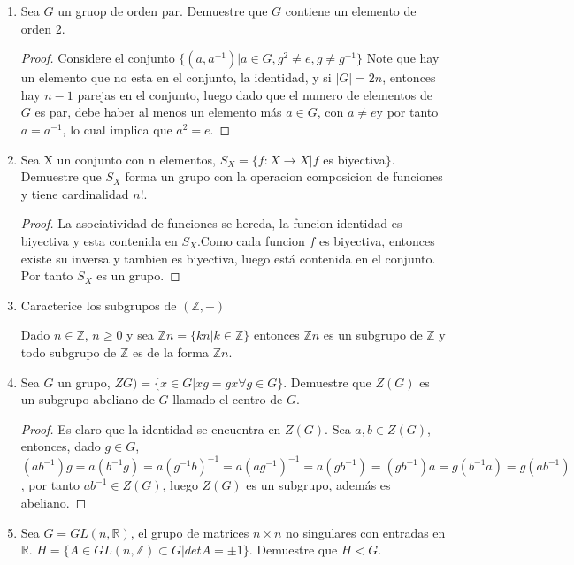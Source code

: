 \documentclass{article}
\theoremstyle{break}
\begin{document}
\begin{enumerate}
		\begin{proof}
			Sea $ A,B\in I(S)$ entonces, como $A(S)\subset S y A^{-1}(S)\subset S$ entonces $A^{-1}(S)\subset S$ y $(A^{-1})^{-1}(S)\subset SA^{-1}(S)\subset S$ implican que $A^{-1}\subset S$ Luego la composicion de funcioes tambien es ortogonal, por lo cual $B\circ A^{-1}(S) \subset B(S)\subset S$ y tambien para la imagen inversa, por lo tanto, $I(S)$ es un subgrupo.
		
		\end{proof}
		
		\item Sea $G$ un gruop de orden par. Demuestre que $G$ contiene un elemento de orden 2.
		
			\begin{proof}
				Considere el conjunto $\{(a,a^{-1})|a\in G, g^2\not=e, g\not=g^{-1}\}$ Note que hay un elemento que no esta en el conjunto, la identidad, y si $|G|=2n$, entonces hay $n-1$ parejas en el conjunto, luego dado que el numero de elementos de $G$ es par, debe haber al menos un elemento m\'as $a\in G$, con $a\not=e$y por tanto $a=a^{-1}$, lo cual implica que $a^2=e$.
				
			\end{proof}
			
		\item Sea X un conjunto con n elementos, $S_X=\{f:X\rightarrow X| f$ es biyectiva$\}$. Demuestre que $S_X$ forma un grupo con la operacion composicion de funciones y tiene cardinalidad $n!$. 
			\begin{proof}
				
				La asociatividad de funciones se hereda, la funcion identidad es biyectiva y esta contenida en $S_X$.Como cada funcion $f$ es biyectiva, entonces existe su inversa y tambien es biyectiva, luego est\'a contenida en el conjunto. Por tanto $S_X$ es un grupo.

			\end{proof}
		\item Caracterice los subgrupos de $(\mathbb{Z},+)$
		
			Dado $n\in\mathbb{Z}$, $n\geq 0$ y sea $\mathbb{Z}n=\{kn|k\in\mathbb{Z}\}$ entonces $\mathbb{Z}n$ es un subgrupo de $\mathbb{Z}$ y todo subgrupo de $\mathbb{Z}$ es de la forma $\mathbb{Z}n$.
			
			\item Sea $G$ un grupo, $ZG)=\{ x\in G|xg=gx  \forall g\in G\}$. Demuestre que $Z(G)$ es un subgrupo abeliano de $G$ llamado el centro de $G$.
			
			\begin{proof}
				Es claro que la identidad se encuentra en $Z(G)$. Sea $a,b\in Z(G)$, entonces, dado $g\in G$, $(ab^{-1})g=a(b^{-1}g)=a(g^{-1}b)^{-1}=a(ag^{-1})^{-1}=a(gb^{-1})=(gb^{-1})a=g(b^{-1}a)=g(ab^{-1})$, por tanto $ab^{-1}\in Z(G)$, luego $Z(G)$ es un subgrupo, adem\'as es abeliano.
			\end{proof}
		\item Sea $G=GL(n,\mathbb{R})$, el grupo de matrices $n\times n$ no singulares con entradas en $\mathbb{R}$. $H=\{A\in GL(n,\mathbb{Z})\subset G| detA=\pm 1\}$. Demuestre que $H<G$.
		

\end{enumerate}
\end{document}
